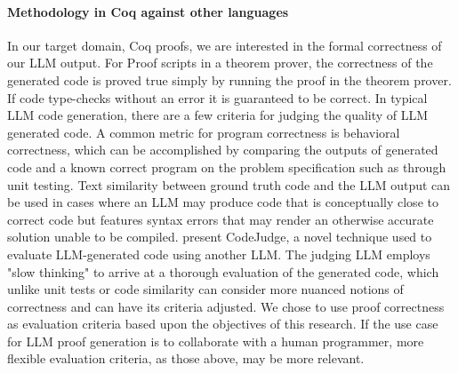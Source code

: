 \paragraph{Methodology in Coq against other languages}
In our target domain, Coq proofs, 
we are interested in the formal correctness of our LLM output.
For Proof scripts in a theorem prover,
the correctness of the generated code is proved true
simply by running the proof in the theorem prover.
If code type-checks without an error it is guaranteed to be correct.
In typical LLM code generation,
there are a few criteria for judging the quality of LLM generated code.  
A common metric for program correctness is behavioral correctness,
which can be accomplished by comparing the outputs of generated code
and a known correct program on the problem specification such as through unit testing.
Text similarity between ground truth code and the LLM output can be used
in cases where an LLM may produce code that is conceptually close
to correct code but features syntax errors that may render an
otherwise accurate solution unable to be compiled.
\citet{CodeJudge} present CodeJudge, a novel technique
used to evaluate LLM-generated code using another LLM.
The judging LLM employs "slow thinking" to arrive at a
thorough evaluation of the generated code,
which unlike unit tests or code similarity can consider
more nuanced notions of correctness and can have its
criteria adjusted.
We chose to use proof correctness as evaluation criteria
based upon the objectives of this research.
If the use case for LLM proof generation is to
collaborate with a human programmer,
more flexible evaluation criteria, as those above, may be more relevant. 

